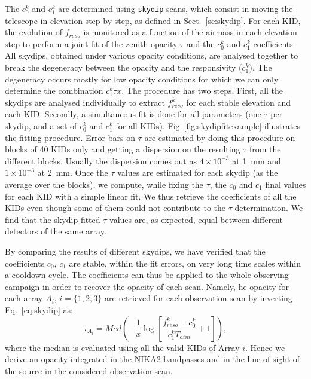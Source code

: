 The $c_0^k$ and $c_1^k$ are determined using {\tt skydip} scans, which
consist in moving the telescope in elevation step by step, as
defined in Sect.~\ref{se:skydip}. For each KID, the evolution
of $f_{reso}$ is monitored as a function of the airmass in each
elevation step to perform a joint fit of the zenith opacity $\tau$ and
the $c_0^k$ and $c_1^k$ coefficients.
All skydips, obtained under various opacity conditions, are analysed
together to break the degeneracy between the opacity and the
responsivity ($c_1^k$). The degeneracy occurs mostly for low opacity
conditions for which we can only determine the combination
$c_1^k \tau x$. The procedure has two steps. First, all the skydips
are analysed individually to extract $f_{reso}^k$ for each
stable elevation and each KID. Secondly, a simultaneous fit is done
for all parameters (one $\tau$ per skydip, and a set of $c_0^k$ and
$c_1^k$ for all KIDs). Fig~\ref{fig:skydipfitexample} illustrates the
fitting procedure.  Error bars on $\tau$ are estimated by doing this
procedure
on blocks of 40 KIDs only and getting a dispersion on the resulting
$\tau$ from the different blocks. Usually the dispersion comes out as
$4\times 10^{-3}$ at 1~mm and $1\times 10^{-3}$ at 2~mm. Once the
$\tau$ values are estimated for each skydip (as the average over the
blocks), we compute, while fixing the $\tau$, the $c_0$ and $c_1$
final values for each KID with a simple linear fit. We thus retrieve
the coefficients of all the KIDs even though some of them could not
contribute to the $\tau$ determination. We find that the skydip-fitted
$\tau$ values are, as expected, equal between different detectors of
the same array.

By comparing the results of different skydips, we have verified that the
coefficients $c_0$, $c_1$ are stable, within the fit errors, on very
long time scales within a cooldown cycle. The coefficients can thus be
applied to the whole observing campaign in order to recover the
opacity of each scan. Namely, he opacity for each array
$A_i$, $i=\{1, 2, 3\}$ are retrieved for each observation scan by
inverting Eq.~\ref{eq:skydip} as:
\begin{equation}
\tau_{A_i} =   Med\left( -\frac{1}{x} \log\left[ \frac{f_{reso}^k - c_0^k}{c_1^kT_{atm}} +1 \right]\right), 
\end{equation}
where the median is evaluated using all the valid KIDs of Array
$i$. Hence we derive an opacity integrated in the NIKA2 bandpasses and
in the line-of-sight of the source in the considered observation scan.


